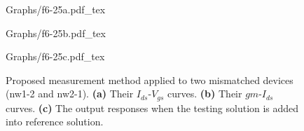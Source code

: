 \documentclass{article}
\begin{document}
\begin{figure}[!hb]

    \begin{minipage}[!htb]{0.5\linewidth}
        \centering
        \def\svgwidth{4cm}
        \fontsize{6}{8}\selectfont
         {Graphs/f6-25a.pdf_tex}
        \fontsize{8}{10}\selectfont
    \end{minipage}
    \hfill
    \begin{minipage}[!htb]{0.5\linewidth}
        \centering
        \def\svgwidth{5.1cm}
        \fontsize{6}{8}\selectfont
         {Graphs/f6-25b.pdf_tex}
        \fontsize{8}{10}\selectfont
    \end{minipage}

    \begin{minipage}[!hb]{1\linewidth}
        \centering
        \def\svgwidth{9cm}
        \fontsize{8}{10}\selectfont
         {Graphs/f6-25c.pdf_tex}
        \fontsize{8}{10}\selectfont
    \end{minipage}
    \caption{Proposed measurement method applied to two mismatched devices (nw1-2 and nw2-1).
                \textbf{(a)} Their $I_{ds}$-$V_{gs}$ curves.
                \textbf{(b)} Their $gm$-$I_{ds}$ curves.
                \textbf{(c)} The output responses when the testing solution is added into reference solution.
                }
    \label{fig:dV}
\end{figure}



\end{document}
